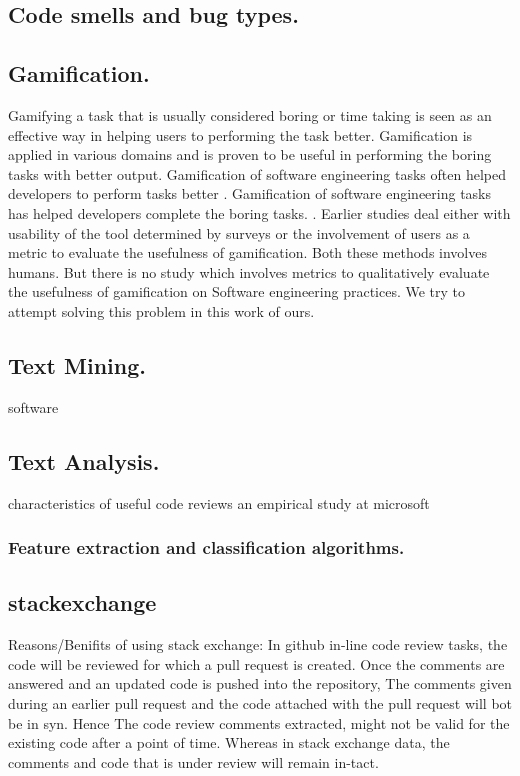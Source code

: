 \documentclass[conference]{IEEEtran}
\begin{document}
\subsection{Code smells and bug types.}


\subsection{Gamification.}
Gamifying a task that is usually considered boring or time taking is seen as an effective way in helping users to performing the task better. Gamification is applied in various domains and is proven to be useful in performing the boring tasks with better output. Gamification of software engineering tasks often helped developers to perform tasks better \cite{needed}. Gamification of software engineering tasks has helped developers complete the boring tasks. \cite{needed}. Earlier studies \cite{needed} deal either with usability of the tool determined by surveys or the involvement of users as a metric to evaluate the usefulness of gamification. Both these methods involves humans.  But there is no study which involves metrics to qualitatively evaluate the usefulness of gamification on Software engineering practices. We try to attempt solving this problem in this work of ours.

\subsection{Text Mining.}
software  

\subsection{Text Analysis.}
characteristics of useful code reviews an empirical study at microsoft
\subsubsection{Feature extraction and classification algorithms.}

\subsection{stackexchange}

Reasons/Benifits of using stack exchange:
In github in-line code review tasks, the code will be reviewed for which a pull request is created. Once the comments are answered and an updated code is pushed into the repository, The comments given during an earlier pull request and the code attached with the pull request will bot be in syn. Hence The code review comments extracted, might not be valid for the existing code after a point of time. Whereas in stack exchange data, the comments and code that is under review will remain in-tact. 
\end{document}
